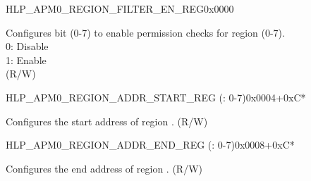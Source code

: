 \begin{register}{H}{LP\_APM0\_REGION\_FILTER\_EN\_REG}{0x0000}\label{regdesc:LPAPM0REGIONFILTERENREG}
%
%
\regnewline%
\begin{regdesc}\begin{reglist}
\label{fielddesc:LPAPM0REGIONFILTEREN}\item [LP\_APM0\_REGION\_FILTER\_EN] Configures bit  (0-7) to enable permission checks for region  (0-7).\\
0: Disable \\
1: Enable  \\ (R/W)
\end{reglist}\end{regdesc}
\end{register}


\begin{register}{H}{LP\_APM0\_REGION\_ADDR\_START\_REG (: 0-7)}{0x0004+0xC*}\label{regdesc:LPAPM0REGIONNADDRSTARTREG}
%
\regnewline%
\begin{regdesc}\begin{reglist}
\label{fielddesc:LPAPM0REGIONNADDRSTART}\item [LP\_APM0\_REGION\regindex{n}\_ADDR\_START] Configures the start address of region . (R/W)
\end{reglist}\end{regdesc}
\end{register}


\begin{register}{H}{LP\_APM0\_REGION\_ADDR\_END\_REG (: 0-7)}{0x0008+0xC*}\label{regdesc:LPAPM0REGIONNADDRENDREG}
%
\regnewline%
\begin{regdesc}\begin{reglist}
\label{fielddesc:LPAPM0REGIONNADDREND}\item [LP\_APM0\_REGION\regindex{n}\_ADDR\_END] Configures the end address of region . (R/W)
\end{reglist}\end{regdesc}
\end{register}


